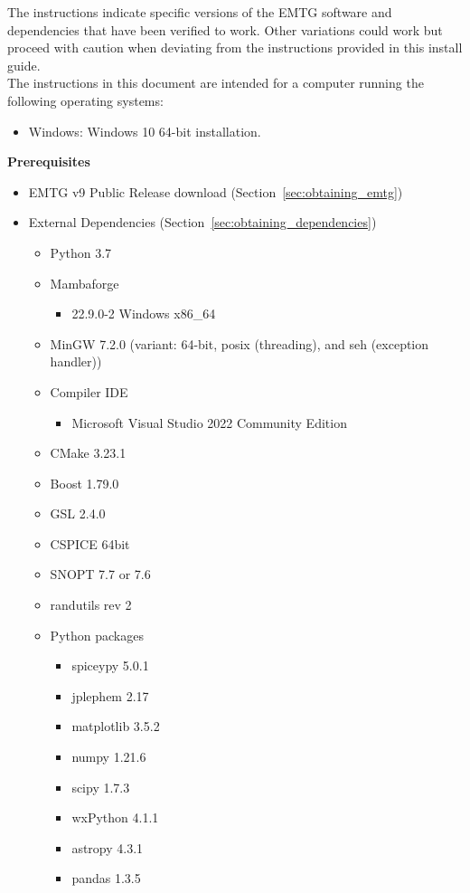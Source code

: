 
\noindent The instructions indicate specific versions of the EMTG software and dependencies that have been verified to work. Other variations could work but proceed with caution when deviating from the instructions provided in this install guide. \\

\noindent The instructions in this document are intended for a computer running the following operating systems:
\begin{itemize}
	\item Windows: Windows 10 64-bit installation.
\end{itemize}

\noindent \textbf{Prerequisites}
\begin{itemize}
	\item EMTG v9 Public Release download (Section~\ref{sec:obtaining_emtg})
	\item External Dependencies (Section~\ref{sec:obtaining_dependencies})
	\begin{itemize}
		\item Python 3.7
		\item Mambaforge 
		\begin{itemize}
			\item 22.9.0-2 Windows x86\_64  %
		\end{itemize}	
		\item MinGW 7.2.0 (variant: 64-bit, posix (threading), and seh (exception handler))
		\item Compiler IDE
		\begin{itemize}
			\item Microsoft Visual Studio 2022 Community Edition  %
		\end{itemize}	
		\item CMake 3.23.1
		\item Boost 1.79.0
		\item GSL 2.4.0
		\item CSPICE 64bit
		\item SNOPT 7.7 or 7.6
		\item randutils rev 2
		\item Python packages
		\begin{itemize}
			\item spiceypy 5.0.1 
			\item jplephem 2.17 
			\item matplotlib 3.5.2
			\item numpy 1.21.6 
			\item scipy 1.7.3
			\item wxPython 4.1.1
			\item astropy 4.3.1
			\item pandas 1.3.5
		\end{itemize}		
	\end{itemize}
\end{itemize}